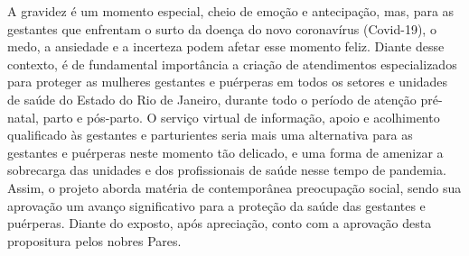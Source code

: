 \documentclass[10pt]{article}
\begin{document}
  A gravidez é um momento especial, cheio de emoção e antecipação, mas, para as gestantes que enfrentam o surto da doença do novo coronavírus (Covid-19), o medo, a ansiedade e a incerteza podem afetar esse momento feliz.
Diante desse contexto, é de fundamental importância a criação de atendimentos especializados para proteger as mulheres gestantes e puérperas em todos os setores e unidades de saúde do Estado do Rio de Janeiro, durante todo o período de atenção pré-natal, parto e pós-parto.
O serviço virtual de informação, apoio e acolhimento qualificado às gestantes e parturientes seria mais uma alternativa para as gestantes e puérperas neste momento tão delicado, e uma forma de amenizar a sobrecarga das unidades e dos profissionais de saúde nesse tempo de pandemia.
Assim, o projeto aborda matéria de contemporânea preocupação social, sendo sua aprovação um avanço significativo para a proteção da saúde das gestantes e puérperas.
Diante do exposto, após apreciação, conto com a aprovação desta propositura pelos nobres Pares.



\iffalse
\begin{center}
  \textbf{REFERÊNCIAS}
\end{center}


\fi
\end{document}
